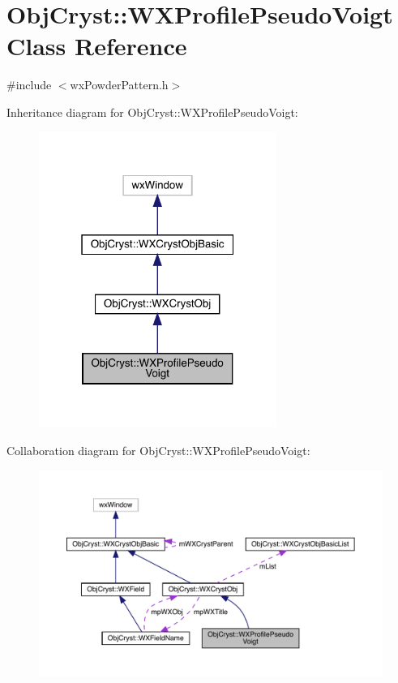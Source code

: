 \hypertarget{class_obj_cryst_1_1_w_x_profile_pseudo_voigt}{}\section{Obj\+Cryst\+::W\+X\+Profile\+Pseudo\+Voigt Class Reference}
\label{class_obj_cryst_1_1_w_x_profile_pseudo_voigt}


{\ttfamily \#include $<$wx\+Powder\+Pattern.\+h$>$}



Inheritance diagram for Obj\+Cryst\+::W\+X\+Profile\+Pseudo\+Voigt\+:
\nopagebreak
\begin{figure}[H]
\begin{center}
\leavevmode
\includegraphics[width=220pt]{class_obj_cryst_1_1_w_x_profile_pseudo_voigt__inherit__graph}
\end{center}
\end{figure}


Collaboration diagram for Obj\+Cryst\+::W\+X\+Profile\+Pseudo\+Voigt\+:
\nopagebreak
\begin{figure}[H]
\begin{center}
\leavevmode
\includegraphics[width=350pt]{class_obj_cryst_1_1_w_x_profile_pseudo_voigt__coll__graph}
\end{center}
\end{figure}
